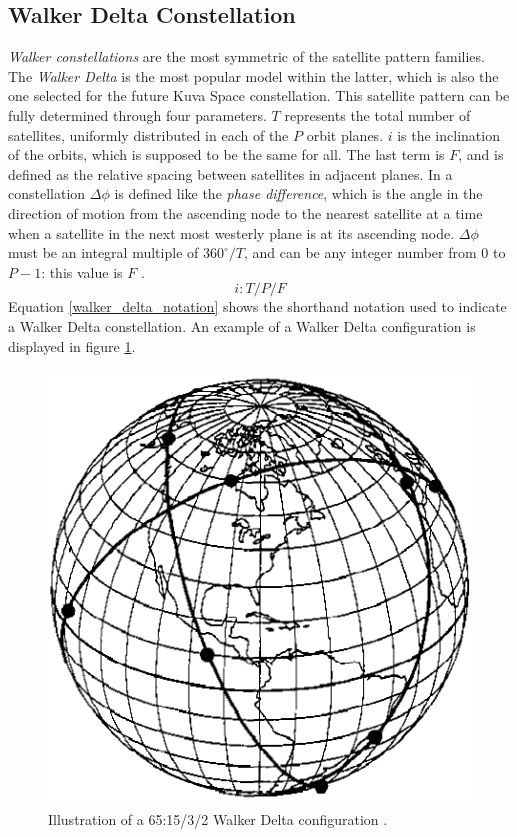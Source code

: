 \subsection{Walker Delta Constellation}
\textit{Walker constellations} are the most symmetric of the satellite pattern families.
The \textit{Walker Delta} is the most popular model within the latter, which is also the one selected for the future Kuva Space constellation.
This satellite pattern can be fully determined through four parameters. 
$T$ represents the total number of satellites, uniformly distributed in each of the $P$ orbit planes.
$i$ is the inclination of the orbits, which is supposed to be the same for all.
The last term is $F$, and is defined as the relative spacing between satellites in adjacent planes.
In a constellation $\Delta \phi$ is defined like the \textit{phase difference}, which is the angle in the direction of motion from the ascending node to the nearest satellite at a time when a satellite in the next most westerly plane is at its ascending node.
$\Delta \phi$ must be an integral multiple of $360^\circ / T$, and can be any integer number from $0$ to $P-1$: this value is $F$ \cite{wertz2009orbit}.
\begin{equation} \label{walker_delta_notation}
    i : T/P/F
\end{equation}
Equation \ref{walker_delta_notation} shows the shorthand notation used to indicate a Walker Delta constellation.
An example of a Walker Delta configuration is displayed in figure \ref{walker_delta_representation}.

\begin{figure}
    \centering
    \includegraphics[scale=0.5]{img/walker_delta.png}        
    \caption{Illustration of a 65:15/3/2 Walker Delta configuration \cite{wertz2009orbit}.}
    \label{walker_delta_representation}
\end{figure}

